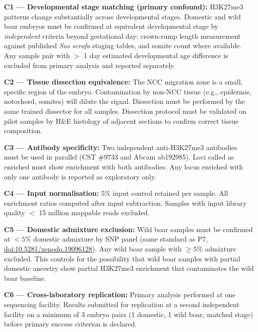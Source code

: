 \documentclass[10pt, a4paper]{article}
\begin{document}
\begin{mdframed}[
  backgroundcolor=controlbox,
  linecolor=headergreen,
  linewidth=0.8pt,
  innertopmargin=0.5em,
  innerbottommargin=0.5em,
  innerleftmargin=0.8em,
  innerrightmargin=0.8em
]
\textbf{C1 --- Developmental stage matching
(primary confound):}
H3K27me3 patterns change substantially
across developmental stages. Domestic and
wild boar embryos must be confirmed at
equivalent developmental stage by
\textit{independent} criteria beyond gestational
day: crown-rump length measurement against
published \textit{Sus scrofa} staging tables,
and somite count where available.
Any sample pair with $>$ 1 day estimated
developmental age difference is excluded
from primary analysis and reported separately.

\medskip
\textbf{C2 --- Tissue dissection equivalence:}
The NCC migration zone is a small, specific
region of the embryo. Contamination by
non-NCC tissue (e.g., epidermis, notochord,
somites) will dilute the signal.
Dissection must be performed by the same
trained dissector for all samples.
Dissection protocol must be validated on
pilot samples by H\&E histology of adjacent
sections to confirm correct tissue composition.

\medskip
\textbf{C3 --- Antibody specificity:}
Two independent anti-H3K27me3 antibodies
must be used in parallel (CST \#9733 and
Abcam ab192985). Loci called as enriched
must show enrichment with both antibodies.
Any locus enriched with only one antibody
is reported as exploratory only.

\medskip
\textbf{C4 --- Input normalisation:}
5\% input control retained per sample.
All enrichment ratios computed after
input subtraction. Samples with input
library quality $<$ 15 million mappable
reads excluded.

\medskip
\textbf{C5 --- Domestic admixture exclusion:}
Wild boar samples must be confirmed at
$< 5\%$ domestic admixture by SNP panel
(same standard as P7,
\href{https://doi.org/10.5281/zenodo.19096128}
{doi:10.5281/zenodo.19096128}).
Any wild boar sample with $\geq 5\%$
admixture excluded. This controls for
the possibility that wild boar samples
with partial domestic ancestry show
partial H3K27me3 enrichment that
contaminates the wild boar baseline.

\medskip
\textbf{C6 --- Cross-laboratory replication:}
Primary analysis performed at one
sequencing facility. Results submitted
for replication at a second independent
facility on a minimum of 3 embryo pairs
(1 domestic, 1 wild boar, matched stage)
before primary success criterion is declared.
\end{mdframed}
\end{document}
